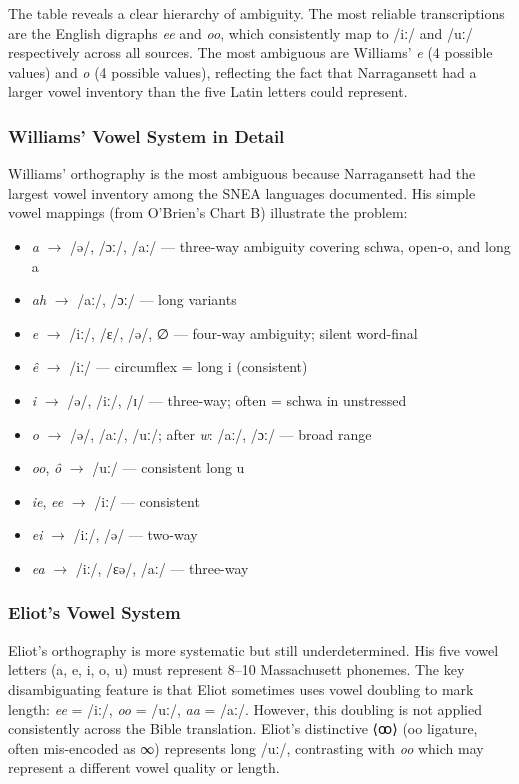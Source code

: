 The table reveals a clear hierarchy of ambiguity. The most reliable
transcriptions are the English digraphs \textit{ee} and \textit{oo}, which
consistently map to /iː/ and /uː/ respectively across all sources. The most
ambiguous are Williams' \textit{e} (4 possible values) and \textit{o} (4
possible values), reflecting the fact that Narragansett had a larger vowel
inventory than the five Latin letters could represent.

\subsubsection{Williams' Vowel System in Detail}

Williams' orthography is the most ambiguous because Narragansett had the
largest vowel inventory among the SNEA languages documented. His simple
vowel mappings (from O'Brien's Chart B) illustrate the problem:

\begin{itemize}
  \item \textit{a} $\rightarrow$ /ə/, /ɔː/, /aː/ --- three-way ambiguity
    covering schwa, open-o, and long a
  \item \textit{ah} $\rightarrow$ /aː/, /ɔː/ --- long variants
  \item \textit{e} $\rightarrow$ /iː/, /ɛ/, /ə/, ∅ --- four-way ambiguity;
    silent word-final
  \item \textit{ê} $\rightarrow$ /iː/ --- circumflex = long i (consistent)
  \item \textit{i} $\rightarrow$ /ə/, /iː/, /ɪ/ --- three-way; often = schwa
    in unstressed
  \item \textit{o} $\rightarrow$ /ə/, /aː/, /uː/; after \textit{w}: /aː/,
    /ɔː/ --- broad range
  \item \textit{oo}, \textit{ô} $\rightarrow$ /uː/ --- consistent long u
  \item \textit{ie}, \textit{ee} $\rightarrow$ /iː/ --- consistent
  \item \textit{ei} $\rightarrow$ /iː/, /ə/ --- two-way
  \item \textit{ea} $\rightarrow$ /iː/, /ɛə/, /aː/ --- three-way
\end{itemize}

\subsubsection{Eliot's Vowel System}

Eliot's orthography is more systematic but still underdetermined. His five
vowel letters (a, e, i, o, u) must represent 8--10 Massachusett phonemes.
The key disambiguating feature is that Eliot sometimes uses vowel doubling
to mark length: \textit{ee} = /iː/, \textit{oo} = /uː/, \textit{aa} = /aː/.
However, this doubling is not applied consistently across the Bible
translation. Eliot's distinctive ⟨ꝏ⟩ (oo ligature, often mis-encoded as ∞)
represents long /uː/, contrasting with \textit{oo} which may represent a
different vowel quality or length.

